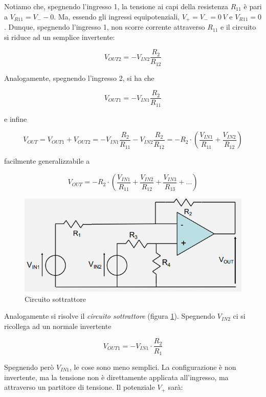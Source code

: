 \documentclass{article}
\begin{document}
\vspace{2mm}

Notiamo che, spegnendo l'ingresso 1, la tensione ai capi della resistenza $R_{11}$ è pari a $V_{R11} = V_- - 0$. Ma, essendo gli ingressi equipotenziali, $V_+ = V_- = 0 \, V$ e $V_{R11} = 0$. Dunque, spegnendo l'ingresso 1, non scorre corrente attraverso $R_{11}$ e il circuito si riduce ad un semplice invertente:

\[V_{OUT2} = - V_{IN2} \frac{R_2}{R_{12}}\]

Analogamente, spegnendo l'ingresso 2, si ha che

\[V_{OUT1} = - V_{IN1} \frac{R_2}{R_{11}}\]

e infine

\[V_{OUT} = V_{OUT1} + V_{OUT2} = - V_{IN1} \frac{R_2}{R_{11}} - V_{IN2} \frac{R_2}{R_{12}} = - R_2 \cdot \left( \frac{V_{IN1}}{R_{11}} + \frac{V_{IN2}}{R_{12}} \right)\]

facilmente generalizzabile a 

\[V_{OUT} = - R_2 \cdot \left( \frac{V_{IN1}}{R_{11}} + \frac{V_{IN2}}{R_{12}} + \frac{V_{IN3}}{R_{13}} + ... \right)\]

\clearpage
\begin{figure}[h]
  \centering
  \includegraphics[scale=0.7]{IM_circuito_sottrattore}
  \caption{Circuito sottrattore}
  \label{Schema_circuito_sottrattore}
\end{figure}

Analogamente si risolve il \textit{circuito sottrattore} (figura \ref{Schema_circuito_sottrattore}). Spegnendo $V_{IN2}$ ci si ricollega ad un normale invertente

\[V_{OUT1} = - V_{IN1} \cdot \frac{R_2}{R_1}\]

Spegnendo però $V_{IN1}$, le cose sono meno semplici. La configurazione è non invertente, ma la tensione non è direttamente applicata all'ingresso, ma attraverso un partitore di tensione. Il potenziale $V_+$ sarà:
\end{document}
